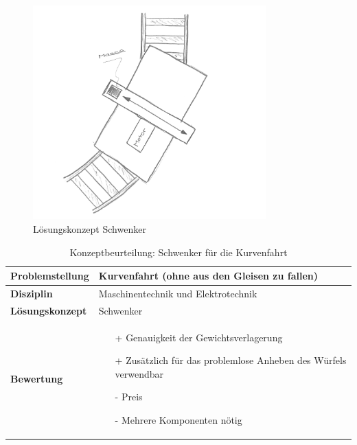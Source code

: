 \documentclass[../../../main.tex]{subfiles}
\begin{document}
    \begin{figure}[H] %
        \centering
        \includegraphics[width=0.8\textwidth]{Schwenker}
        \caption{Lösungskonzept Schwenker}
        \label{fig:schwenker}
    \end{figure}

    \begin{flushleft}
        \begin{table}[h]
        \begin{tabular}{ | l | p{11cm} |}
        \hline
        \textbf{Problemstellung} & Kurvenfahrt (ohne aus den Gleisen zu fallen) \\ \hline
        \textbf{Disziplin} & Maschinentechnik und Elektrotechnik \\ \hline
        \textbf{Lösungskonzept} & Schwenker \\ \hline
        \textbf{Bewertung} &  \begin{itemize}
                                \item[+] Genauigkeit der Gewichtsverlagerung
                                \item[+] Zusätzlich für das problemlose Anheben des Würfels verwendbar
                                \item[-] Preis 
                                \item[-] Mehrere Komponenten nötig 
                              \end{itemize} \\ \hline
        \end{tabular}
        \caption{Konzeptbeurteilung: Schwenker für die Kurvenfahrt}
        \label{tab:schwenker}
    \end{table}
    \end{flushleft}
\end{document}
